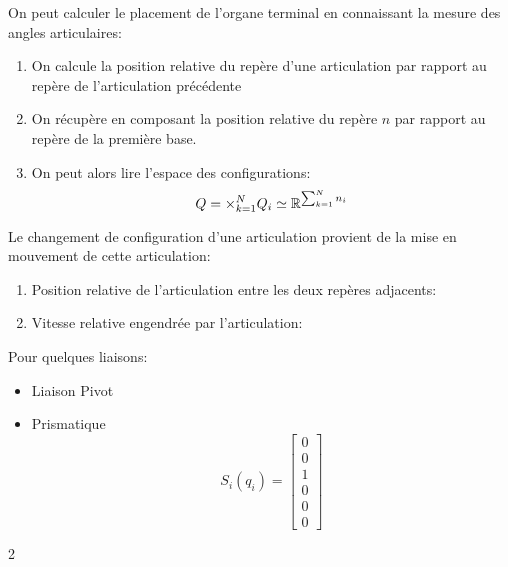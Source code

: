\documentclass[math]{cours}
\begin{document}
\begin{proposition}
	On peut calculer le placement de l'organe terminal en connaissant la mesure des angles articulaires:
	\begin{enumerate}
		\item On calcule la position relative du repère d'une articulation par rapport au repère de l'articulation précédente
		\item On récupère en composant la position relative du repère $n$ par rapport au repère de la première base.
		\item On peut alors lire l'espace des configurations:
		      \begin{equation*}
			      Q = \times_{k = 1}^{N} Q_{i} \simeq \mathbb{R}^{\sum_{k = 1}^{N} n_{i}}
		      \end{equation*}
	\end{enumerate}
	\label{prop:positiondirecte}
\end{proposition}

\begin{definition}
	Le changement de configuration d'une articulation provient de la mise en mouvement de cette articulation:
	\begin{enumerate}
		\item Position relative de l'articulation entre les deux repères adjacents:
		\item Vitesse relative engendrée par l'articulation:
	\end{enumerate}
	Pour quelques liaisons:
	\begin{multicols}{2}
	\begin{itemize}
		\item Liaison Pivot
		\item Prismatique \begin{equation*}
			      S_{i}(q_{i}) = \begin{bmatrix}
				      0 \\ 0\\ 1\\ 0\\ 0\\ 0
			      \end{bmatrix}
		      \end{equation*}
	\end{itemize}
	\end{multicols}{2}
	\label{def:vitessearticulaire}
\end{definition}
\end{document}
